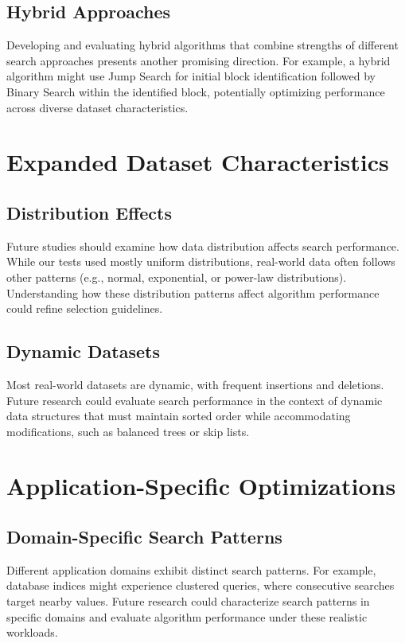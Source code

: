 \subsection{Hybrid Approaches}
Developing and evaluating hybrid algorithms that combine strengths of different search approaches presents another promising direction. For example, a hybrid algorithm might use Jump Search for initial block identification followed by Binary Search within the identified block, potentially optimizing performance across diverse dataset characteristics.

\section{Expanded Dataset Characteristics}

\subsection{Distribution Effects}
Future studies should examine how data distribution affects search performance. While our tests used mostly uniform distributions, real-world data often follows other patterns (e.g., normal, exponential, or power-law distributions). Understanding how these distribution patterns affect algorithm performance could refine selection guidelines.

\subsection{Dynamic Datasets}
Most real-world datasets are dynamic, with frequent insertions and deletions. Future research could evaluate search performance in the context of dynamic data structures that must maintain sorted order while accommodating modifications, such as balanced trees or skip lists.

\section{Application-Specific Optimizations}

\subsection{Domain-Specific Search Patterns}
Different application domains exhibit distinct search patterns. For example, database indices might experience clustered queries, where consecutive searches target nearby values. Future research could characterize search patterns in specific domains and evaluate algorithm performance under these realistic workloads.


